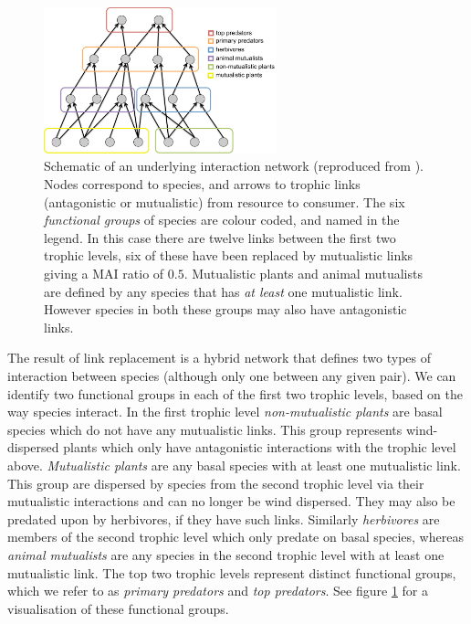 \begin{figure}
	\centering
	\includegraphics[width=0.6\textwidth]{"diagrams/trophic_cartoon"}
	\caption{Schematic of an underlying interaction network (reproduced from \cite{lurgi2015effects}). Nodes correspond to species, and arrows to trophic links (antagonistic or mutualistic) from resource to consumer. The six \emph{functional groups} of species are colour coded, and named in the legend. In this case there are twelve links between the first two trophic levels, six of these have been replaced by mutualistic links giving a MAI ratio of $0.5$. Mutualistic plants and animal mutualists are defined by any species that has \emph{at least} one mutualistic link. However species in both these groups may also have antagonistic links.}
	\label{fig:trophic_cartoon}
\end{figure}

The result of link replacement is a hybrid network that defines two types of interaction between species (although only one between any given pair). We can identify two functional groups in each of the first two trophic levels, based on the way species interact. In the first trophic level \emph{non-mutualistic plants} are basal species which do not have any mutualistic links. This group represents wind-dispersed plants which only have antagonistic interactions with the trophic level above. \emph{Mutualistic plants} are any basal species with at least one mutualistic link. This group are dispersed by species from the second trophic level via their mutualistic interactions and can no longer be wind dispersed. They may also be predated upon by herbivores, if they have such links. Similarly \emph{herbivores} are members of the second trophic level which only predate on basal species, whereas \emph{animal mutualists} are any species in the second trophic level with at least one mutualistic link. The top two trophic levels represent distinct functional groups, which we refer to as \emph{primary predators} and \emph{top predators}. See figure \ref{fig:trophic_cartoon} for a visualisation of these functional groups. 


